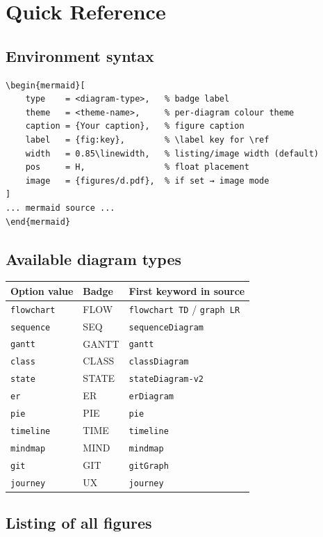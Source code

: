 \documentclass[12pt, a4paper]{article}
\begin{document}
\section{Quick Reference}

\subsection{Environment syntax}

\begin{verbatim}
\begin{mermaid}[
    type    = <diagram-type>,   % badge label
    theme   = <theme-name>,     % per-diagram colour theme
    caption = {Your caption},   % figure caption
    label   = {fig:key},        % \label key for \ref
    width   = 0.85\linewidth,   % listing/image width (default)
    pos     = H,                % float placement
    image   = {figures/d.pdf},  % if set → image mode
]
... mermaid source ...
\end{mermaid}
\end{verbatim}

\subsection{Available diagram types}

\begin{center}
\renewcommand{\arraystretch}{1.3}
\begin{tabular}{lll}
\toprule
\textbf{Option value} & \textbf{Badge} & \textbf{First keyword in source} \\
\midrule
\texttt{flowchart} & FLOW  & \texttt{flowchart TD} / \texttt{graph LR} \\
\texttt{sequence}  & SEQ   & \texttt{sequenceDiagram} \\
\texttt{gantt}     & GANTT & \texttt{gantt} \\
\texttt{class}     & CLASS & \texttt{classDiagram} \\
\texttt{state}     & STATE & \texttt{stateDiagram-v2} \\
\texttt{er}        & ER    & \texttt{erDiagram} \\
\texttt{pie}       & PIE   & \texttt{pie} \\
\texttt{timeline}  & TIME  & \texttt{timeline} \\
\texttt{mindmap}   & MIND  & \texttt{mindmap} \\
\texttt{git}       & GIT   & \texttt{gitGraph} \\
\texttt{journey}   & UX    & \texttt{journey} \\
\bottomrule
\end{tabular}
\end{center}

\subsection{Listing of all figures}

\listoffigures

\bigskip
\MermaidLiveNote
\end{document}

